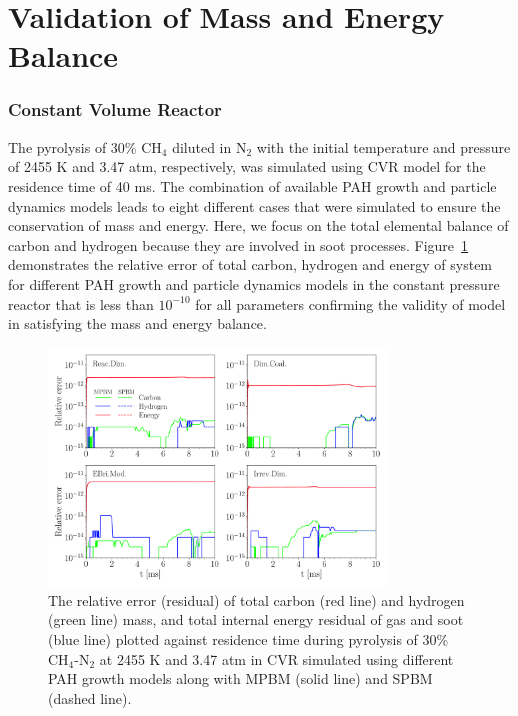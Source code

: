 \section{Validation of Mass and Energy Balance}

\subsubsection{Constant Volume Reactor}
The pyrolysis of 30\% $\mathrm{CH_4}$ diluted in $\mathrm{N_2}$ with the initial temperature and pressure of 2455 K and 3.47 atm, respectively, was simulated using CVR model for the residence time of 40 ms. The combination of available PAH growth and particle dynamics models leads to eight different cases that were simulated to ensure the conservation of mass and energy. Here, we focus on the total elemental balance of carbon and hydrogen because they are involved in soot processes. 
Figure~\ref{fig:constuvvalid} demonstrates the relative error of total carbon, hydrogen and energy of system for different PAH growth and particle dynamics models in the constant pressure reactor that is less than $\mathrm{10^{-10}}$ for all parameters confirming the validity of model in satisfying the mass and energy balance.

\begin{figure}[H]
	\centering
	\includegraphics[width=0.8\textwidth]{Figures/Results/Validation/ConstUV/relerr_constuv.pdf}
	\caption{The relative error (residual) of total carbon (red line) and hydrogen (green line) mass, and total internal energy residual of gas and soot (blue line) plotted against residence time during pyrolysis of 30\% $\mathrm{CH_4}$-$\mathrm{N_2}$ at 2455 K and 3.47 atm in CVR simulated using different PAH growth models along with MPBM (solid line) and SPBM (dashed line).}
	\label{fig:constuvvalid}
\end{figure}


